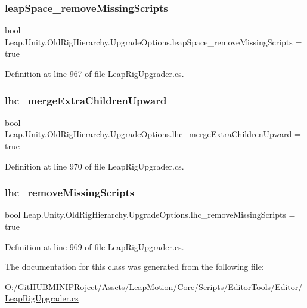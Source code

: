 \subsubsection{\texorpdfstring{leapSpace\_removeMissingScripts}{leapSpace\_removeMissingScripts}}
{\footnotesize\ttfamily bool Leap.\+Unity.\+Old\+Rig\+Hierarchy.\+Upgrade\+Options.\+leap\+Space\+\_\+remove\+Missing\+Scripts = true}



Definition at line 967 of file Leap\+Rig\+Upgrader.\+cs.

\mbox{\label{class_leap_1_1_unity_1_1_old_rig_hierarchy_1_1_upgrade_options_a77b2f694059bde9437ec4df2dae8e743}} 
\subsubsection{\texorpdfstring{lhc\_mergeExtraChildrenUpward}{lhc\_mergeExtraChildrenUpward}}
{\footnotesize\ttfamily bool Leap.\+Unity.\+Old\+Rig\+Hierarchy.\+Upgrade\+Options.\+lhc\+\_\+merge\+Extra\+Children\+Upward = true}



Definition at line 970 of file Leap\+Rig\+Upgrader.\+cs.

\mbox{\label{class_leap_1_1_unity_1_1_old_rig_hierarchy_1_1_upgrade_options_a7b1ad80bb624f91b59f47946a436c082}} 
\subsubsection{\texorpdfstring{lhc\_removeMissingScripts}{lhc\_removeMissingScripts}}
{\footnotesize\ttfamily bool Leap.\+Unity.\+Old\+Rig\+Hierarchy.\+Upgrade\+Options.\+lhc\+\_\+remove\+Missing\+Scripts = true}



Definition at line 969 of file Leap\+Rig\+Upgrader.\+cs.



The documentation for this class was generated from the following file\+:\begin{DoxyCompactItemize}
\item 
O\+:/\+Git\+H\+U\+B\+M\+I\+N\+I\+P\+Roject/\+Assets/\+Leap\+Motion/\+Core/\+Scripts/\+Editor\+Tools/\+Editor/\mbox{\hyperlink{_leap_rig_upgrader_8cs}{Leap\+Rig\+Upgrader.\+cs}}\end{DoxyCompactItemize}
